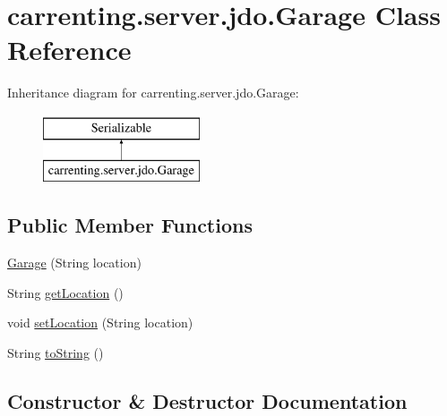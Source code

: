 \hypertarget{classcarrenting_1_1server_1_1jdo_1_1_garage}{}\section{carrenting.\+server.\+jdo.\+Garage Class Reference}
\label{classcarrenting_1_1server_1_1jdo_1_1_garage}
Inheritance diagram for carrenting.\+server.\+jdo.\+Garage\+:\begin{figure}[H]
\begin{center}
\leavevmode
\includegraphics[height=2.000000cm]{classcarrenting_1_1server_1_1jdo_1_1_garage}
\end{center}
\end{figure}
\subsection*{Public Member Functions}
\begin{DoxyCompactItemize}
\item 
\mbox{\hyperlink{classcarrenting_1_1server_1_1jdo_1_1_garage_a37fa4baaeb34f3e34c27dcd0924acaf5}{Garage}} (String location)
\item 
String \mbox{\hyperlink{classcarrenting_1_1server_1_1jdo_1_1_garage_a869f377b57358c6ef3c7d940b2290812}{get\+Location}} ()
\item 
void \mbox{\hyperlink{classcarrenting_1_1server_1_1jdo_1_1_garage_a6a4f4cad62687883824ab42b6a6f5e2b}{set\+Location}} (String location)
\item 
String \mbox{\hyperlink{classcarrenting_1_1server_1_1jdo_1_1_garage_ae60c42c45aea6d43f83728473035e96e}{to\+String}} ()
\end{DoxyCompactItemize}


\subsection{Constructor \& Destructor Documentation}
\mbox{\label{classcarrenting_1_1server_1_1jdo_1_1_garage_a37fa4baaeb34f3e34c27dcd0924acaf5}} 
